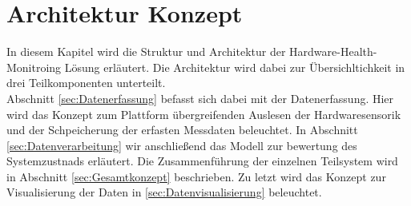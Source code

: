 \chapter{Architektur Konzept}
In diesem Kapitel wird die Struktur und Architektur der Hardware-Health-Monitroing Lösung erläutert. Die Architektur wird dabei zur Übersichltichkeit in drei Teilkomponenten unterteilt.\\
Abschnitt \ref{sec:Datenerfassung} befasst sich dabei mit der Datenerfassung. Hier wird das Konzept zum Plattform übergreifenden Auslesen der Hardwaresensorik und der Schpeicherung der erfasten Messdaten beleuchtet. In Abschnitt \ref{sec:Datenverarbeitung} wir anschließend das Modell zur bewertung des Systemzustnads erläutert.
Die Zusammenführung der einzelnen Teilsystem wird in Abschnitt \ref{sec:Gesamtkonzept} beschrieben. Zu letzt wird das Konzept zur Visualisierung der Daten in \ref{sec:Datenvisualisierung} beleuchtet. 